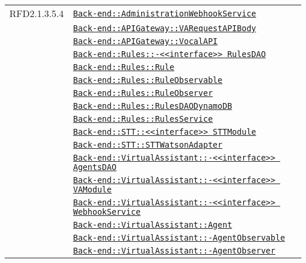 \begin{longtable}{|>{\centering}m{3cm}|m{10cm}<{\centering}|}
RFD2.1.3.5.4 & \hyperref[Back-end::AdministrationWebhookService]{\texttt{Back-end::AdministrationWebhookService}}\\
& \hyperref[Back-end::APIGateway::VARequestAPIBody]{\texttt{Back-end::APIGateway::VARequestAPIBody}}\\
& \hyperref[Back-end::APIGateway::VocalAPI]{\texttt{Back-end::APIGateway::VocalAPI}}\\
& \hyperref[Back-end::Rules::<<interface>> RulesDAO]{\texttt{Back-end::Rules::-\linebreak <<interface>> RulesDAO}}\\
& \hyperref[Back-end::Rules::Rule]{\texttt{Back-end::Rules::Rule}}\\
& \hyperref[Back-end::Rules::RuleObservable]{\texttt{Back-end::Rules::RuleObservable}}\\
& \hyperref[Back-end::Rules::RuleObserver]{\texttt{Back-end::Rules::RuleObserver}}\\
& \hyperref[Back-end::Rules::RulesDAODynamoDB]{\texttt{Back-end::Rules::RulesDAODynamoDB}}\\
& \hyperref[Back-end::Rules::RulesService]{\texttt{Back-end::Rules::RulesService}}\\
& \hyperref[Back-end::STT::<<interface>> STTModule]{\texttt{Back-end::STT::<<interface>> STTModule}}\\
& \hyperref[Back-end::STT::STTWatsonAdapter]{\texttt{Back-end::STT::STTWatsonAdapter}}\\
& \hyperref[Back-end::VirtualAssistant::<<interface>> AgentsDAO]{\texttt{Back-end::VirtualAssistant::-\linebreak <<interface>> AgentsDAO}}\\
& \hyperref[Back-end::VirtualAssistant::<<interface>> VAModule]{\texttt{Back-end::VirtualAssistant::-\linebreak <<interface>> VAModule}}\\
& \hyperref[Back-end::VirtualAssistant::<<interface>> WebhookService]{\texttt{Back-end::VirtualAssistant::-\linebreak <<interface>> WebhookService}}\\
& \hyperref[Back-end::VirtualAssistant::Agent]{\texttt{Back-end::VirtualAssistant::Agent}}\\
& \hyperref[Back-end::VirtualAssistant::AgentObservable]{\texttt{Back-end::VirtualAssistant::-\linebreak AgentObservable}}\\
& \hyperref[Back-end::VirtualAssistant::AgentObserver]{\texttt{Back-end::VirtualAssistant::-\linebreak AgentObserver}}\\

\end{longtable}
